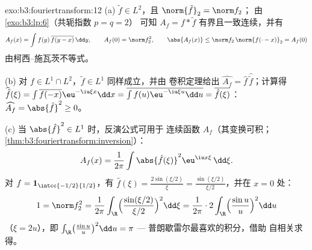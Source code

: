\begin{solution}{exo:b3:fouriertransform:12}
(a) $\tilde f \in L^2$，且 $\norm{\tilde f}_2 = \norm f_2$；
由 \cref{exo:b3:lp:6}（共轭指数 $p = q = 2$）
可知 $A_f = f * \tilde f$ 有界且一致连续，并有
\[
A_f(x) = \int f(y)\,\overline{f(y - x)}\,\dd y,
\qquad A_f(0) = \norm f_2^2,
\qquad \abs{A_f(x)} \leq \norm f_2\,\norm{f(\cdot -
x)}_2 = A_f(0)
\]
由柯西--施瓦茨不等式。

(b) 对 $f \in L^1\cap L^2$，$\tilde f \in L^1$ 同样成立，并由
卷积定理给出 $\widehat{A_f} = \hat f\,
\widehat{\tilde f}$；计算得 $\widehat{\tilde f}(\xi) =
\int\overline{f(-x)}\eu^{-\iu\xi x}\dd x =
\overline{\int f(u)\eu^{-\iu\xi u}\dd u} =
\overline{\hat f(\xi)}$：$\widehat{A_f} = \abs{\hat f}^2
\geq 0$。

(c) 当 $\abs{\hat f}^2 \in L^1$ 时，反演公式可用于
连续函数 $A_f$（其变换可积；
\cref{thm:b3:fouriertransform:inversion}）：
\[
A_f(x) = \frac1{2\pi}\int\abs{\hat f(\xi)}^2
\eu^{\iu x\xi}\,\dd\xi .
\]
对 $f = \mathbf 1_{\intcc{-1/2}{1/2}}$，有 $\hat f(\xi) =
\frac{2\sin(\xi/2)}\xi = \frac{\sin(\xi/2)}{\xi/2}$，并在
$x = 0$ 处：
\[
1 = \norm f_2^2 = \frac1{2\pi}\int_\R
\Bigl(\frac{\sin(\xi/2)}{\xi/2}\Bigr)^2\dd\xi
= \frac1{2\pi}\cdot2\int_\R\Bigl(\frac{\sin u}u\Bigr)^2\dd u
\]
（$\xi = 2u$），即 $\int_\R\bigl(\frac{\sin u}u\bigr)^2\dd
u = \pi$ --- 普朗歇雷尔最喜欢的积分，借助
自相关求得。
\end{solution}

